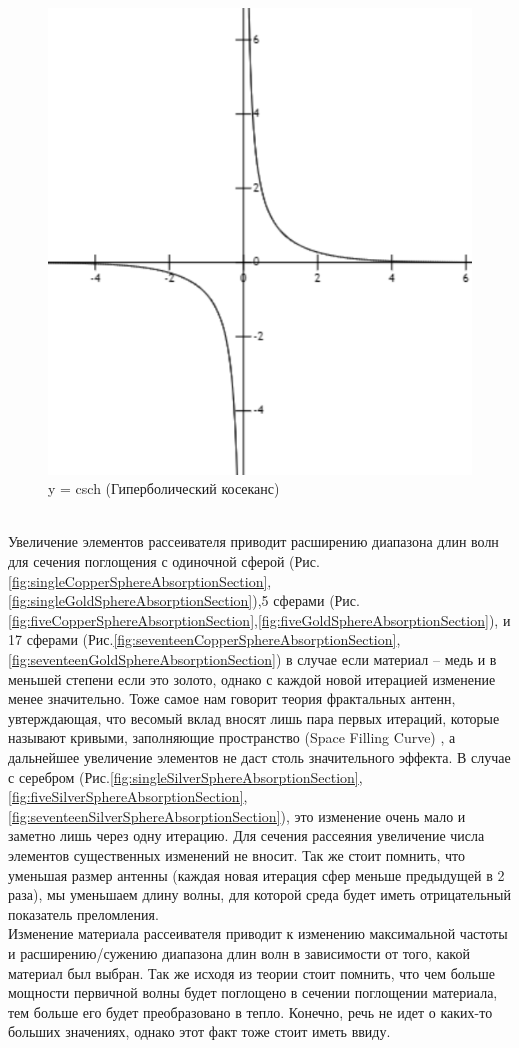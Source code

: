 \begin{figure}[h!]
	\centering
	\includegraphics[width=0.32\linewidth]{csch}
	\caption{y = csch (Гиперболический косеканс)}
	\label{fig:csch}
\end{figure}\\
Увеличение элементов рассеивателя приводит расширению диапазона длин волн для сечения поглощения с одиночной сферой (Рис.\ref{fig:singleCopperSphereAbsorptionSection},\ref{fig:singleGoldSphereAbsorptionSection}),5 сферами (Рис.\ref{fig:fiveCopperSphereAbsorptionSection},\ref{fig:fiveGoldSphereAbsorptionSection}), и 17 сферами (Рис.\ref{fig:seventeenCopperSphereAbsorptionSection},\ref{fig:seventeenGoldSphereAbsorptionSection}) в случае если материал – медь и в меньшей степени если это золото, однако с каждой новой итерацией изменение менее значительно. Тоже самое нам говорит теория фрактальных антенн, увтерждающая, что весомый вклад вносят лишь пара первых итераций, которые называют кривыми, заполняющие пространство (Space Filling Curve) \cite{b12}\cite{b13}, а дальнейшее увеличение элементов не даст столь значительного эффекта.  В случае с серебром (Рис.\ref{fig:singleSilverSphereAbsorptionSection},\ref{fig:fiveSilverSphereAbsorptionSection},\ref{fig:seventeenSilverSphereAbsorptionSection}), это изменение очень мало и заметно лишь через одну итерацию. Для сечения рассеяния увеличение числа элементов существенных изменений не вносит. Так же стоит помнить, что уменьшая размер антенны (каждая новая итерация сфер меньше предыдущей в 2 раза), мы уменьшаем длину волны, для которой среда будет иметь отрицательный показатель преломления. \\
Изменение материала рассеивателя приводит к изменению максимальной частоты и расширению/сужению диапазона длин волн в зависимости от того, какой материал был выбран. Так же исходя из теории стоит помнить, что чем больше мощности первичной волны будет поглощено в сечении поглощении материала, тем больше его будет преобразовано в тепло. Конечно, речь не идет о каких-то больших значениях, однако этот факт тоже стоит иметь ввиду.
